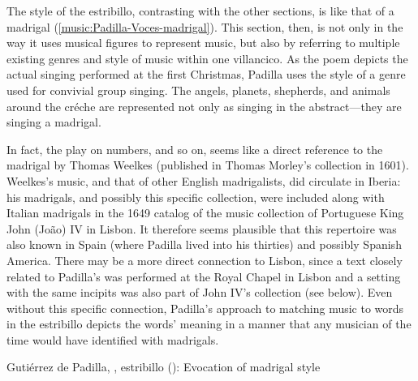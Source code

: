 The style of the estribillo, contrasting with the other sections, is like that
of a madrigal (\cref{music:Padilla-Voces-madrigal}).
This section, then, is  not only in the way it uses
musical figures to represent music, but also by referring to multiple existing
genres and style of music within one villancico.
As the poem depicts the actual singing performed at the first Christmas, Padilla
uses the style of a genre used for convivial group singing.
The angels, planets, shepherds, and animals around the créche are represented
not only as singing in the abstract---they are singing a madrigal.

In fact, the play on numbers,  and so on, seems like a
direct reference to the madrigal  by Thomas Weelkes (published in Thomas Morley's collection
 in 1601).
Weelkes's music, and that of other English madrigalists, did circulate in
Iberia: his madrigals, and possibly this specific collection, were included
along with Italian madrigals in the 1649 catalog of the music collection of
Portuguese King John (João) IV in Lisbon.%
    \Autocite[, 584]{JohnIV:Catalog}
It therefore seems plausible that this repertoire was also known in Spain (where
Padilla lived into his thirties) and possibly Spanish America.
There may be a more direct connection to Lisbon, since a text closely related to
Padilla's  was performed at the Royal Chapel in Lisbon and a
setting with the same incipits was also part of John IV's collection (see
below).
Even without this specific connection, Padilla's approach to matching music to
words in the estribillo depicts the words' meaning in a manner that any musician
of the time would have identified with madrigals.

\begin{musicexample}
    \caption{Gutiérrez de Padilla, , estribillo
    (): Evocation of madrigal style}

    \label{music:Padilla-Voces-madrigal}

\end{musicexample}

